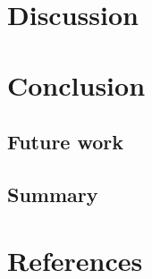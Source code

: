 \documentclass[sn-mathphys,pdflatex]{sn-jnl}%
\theoremstyle{thmstyleone}%
\theoremstyle{thmstyletwo}%
\theoremstyle{thmstylethree}%
\begin{document}
\section{Discussion}\label{sec:results-discussion}

\section{Conclusion}\label{sec:conclusion}

\subsection{Future work}\label{sec:future-work}

\subsection{Summary}\label{sec:summary}

\section*{References}\label{sec:references}

\end{document}
